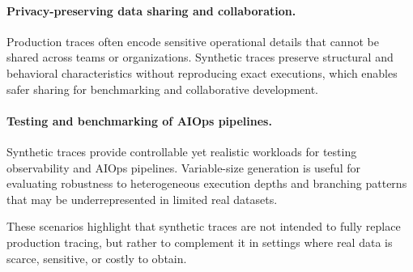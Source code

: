\documentclass[sigconf,review]{acmart}
\begin{document}
\paragraph{Privacy-preserving data sharing and collaboration.}
Production traces often encode sensitive operational details that cannot be shared across teams or organizations. Synthetic traces preserve structural and behavioral characteristics without reproducing exact executions, which enables safer sharing for benchmarking and collaborative development.

\paragraph{Testing and benchmarking of AIOps pipelines.}
Synthetic traces provide controllable yet realistic workloads for testing observability and AIOps pipelines. Variable-size generation is useful for evaluating robustness to heterogeneous execution depths and branching patterns that may be underrepresented in limited real datasets.

These scenarios highlight that synthetic traces are not intended to fully replace production tracing, but rather to complement it in settings where real data is scarce, sensitive, or costly to obtain.
\end{document}
